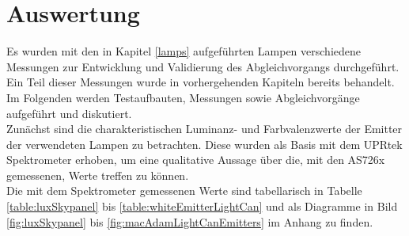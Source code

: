 \documentclass[11pt]{scrartcl}
\begin{document}
\section{Auswertung}
Es wurden mit den in Kapitel \ref{lamps} aufgeführten Lampen verschiedene Messungen zur Entwicklung und Validierung des Abgleichvorgangs durchgeführt.\\
Ein Teil dieser Messungen wurde in vorhergehenden Kapiteln bereits behandelt. Im Folgenden werden Testaufbauten, Messungen sowie Abgleichvorgänge aufgeführt
und diskutiert.\\
Zunächst sind die charakteristischen Luminanz- und Farbvalenzwerte der Emitter der verwendeten Lampen zu betrachten. Diese wurden als Basis mit dem UPRtek
Spektrometer erhoben, um eine qualitative Aussage über die, mit den AS726x gemessenen, Werte treffen zu können.\\
Die mit dem Spektrometer gemessenen Werte sind tabellarisch in Tabelle \ref{table:luxSkypanel} bis \ref{table:whiteEmitterLightCan} und als Diagramme in
Bild \ref{fig:luxSkypanel} bis \ref{fig:macAdamLightCanEmitters} im Anhang zu finden.
\end{document}
